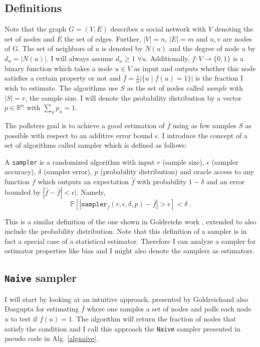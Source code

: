 \label{algorithms}
\subsection{Definitions}
Note that the graph $G = (V,E)$ describes a social network with $V$ denoting the set of nodes and $E$ the set of edges. Further, $|V| = n$, $|E| = m$ and $u,v$ are nodes of G. The set of neighbors of $u$ is denoted by $N(u)$ and the degree of node $u$ by $d_u=|N(u)|$. I will always assume $d_u\geq1\;\forall u$. Additionally, $f : V \rightarrow \{0,1\}$ is a binary function which takes a node $u \in V$ as input and outputs whether this node satisfies a certain property or not and $\bar{f} = \frac{1}{n}|\{u\;|\;f(u) = 1\}|$ is the fraction I wish to estimate.
The algorithms use $S$ as the set of nodes called \textit{sample} with $|S| = r$, the sample size.
I will denote the probability distribution by a vector $p \in \mathbb{R}^n$ with $\sum_up_u = 1$.

The pollsters goal is to achieve a good estimation of $\bar{f}$ using as few samples $S$ as possible with respect to an additive error bound $\epsilon$.
I introduce the concept of a set of algorithms called sampler which is defined as follows:
\begin{definition}[sampler]
\label{defsampler}
  A \texttt{sampler} is a randomized algorithm with input $r$ (sample size), $\epsilon$ (sampler accuracy), $\delta$ (sampler error), $p$ (probability distribution) and oracle access to any function $f$ which outputs an expectation $\hat{f}$ with probability $1-\delta$ and an error bounded by $|\hat{f}-\bar{f}|<\epsilon|$. Namely,
  $$\mathds{P}[|\texttt{sampler}_f(r,\epsilon,\delta,p)-\bar{f} | > \epsilon] < \delta \;.$$
\end{definition}
This is a similar definition of the one shown in Goldreichs work \cite{goldreich1997sample}, extended to also include the probability distribution. 
Note that this definition of a sampler is in fact a special case of a statistical estimator.
Therefore I can analyze a sampler for estimator properties like bias and I might also denote the samplers as estimators.

\subsection{\texttt{Naive} sampler}
I will start by looking at an intuitive approach, presented by Goldreich\cite{goldreich1997sample}and also Dasgupta\cite{dasgupta2012social} for estimating $\bar{f}$ where one samples a set of nodes and polls each node $u$ to test if $f(u)=1$.
The algorithm will return the fraction of nodes that satisfy the condition and I call this approach the \texttt{Naive} sampler presented in pseudo code in Alg. \ref{algnaive}.

